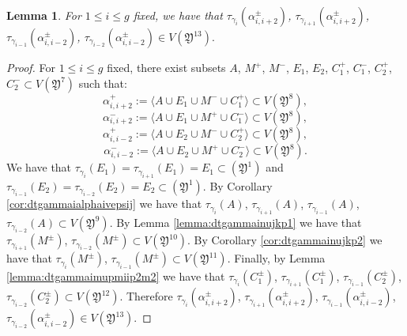 \documentclass{artv3}
\newtheorem{lemma}[theorem]{Lemma}
\newcommand*{\dt}[1]{\tau_{#1}}
\newcommand*{\Y}{\mathfrak{Y}}
\begin{document}
\begin{lemma}\label{lemma:dtgammaialphapmiip2m2}
For $1\leq i \leq g$ fixed, we have that $\dt{\gamma_i}(\alpha_{i,i+2}^{\pm})$, $\dt{\gamma_{i+1}}(\alpha_{i,i+2}^{\pm})$, $\dt{\gamma_{i-1}}(\alpha_{i,i-2}^{\pm})$, $\dt{\gamma_{i-2}}(\alpha_{i,i-2}^{\pm}) \in V(\Y^{13}).$
\end{lemma}
\begin{proof}
For $1 \leq i \leq g$ fixed, there exist subsets $A$, $M^+$, $M^-$, $E_1$, $E_2$, $C_1^+$, $C_1^-$, $C_2^+$, $C_2^-\subset V(\Y^7)$ such that: 
$$\alpha_{i,i+2}^{+} := \langle A \cup E_{1} \cup M^{-} \cup C_{1}^{+}\rangle \subset V(\Y^{8}),$$
$$\alpha_{i,i+2}^{-} := \langle A \cup E_{1} \cup M^{+} \cup C_{1}^{-}\rangle \subset V(\Y^{8}),$$
$$\alpha_{i,i-2}^{+} := \langle A \cup E_{2} \cup M^{-} \cup C_{2}^{+}\rangle \subset V(\Y^{8}),$$
$$\alpha_{i,i-2}^{-} := \langle A \cup E_{2} \cup M^{+} \cup C_{2}^{-}\rangle \subset V(\Y^{8}).$$
We have that $\dt{\gamma_i}(E_1) = \dt{\gamma_{i+1}}(E_1) = E_1\subset(\Y^1)$ and $\dt{\gamma_{i-1}}(E_2) = \dt{\gamma_{i-2}}(E_2) = E_2\subset(\Y^1)$. By Corollary \ref{cor:dtgammaialphaivepsij} we have that $\dt{\gamma_{i}}(A)$, $\dt{\gamma_{i+1}}(A)$, $\dt{\gamma_{i-1}}(A)$, $\dt{\gamma_{i-2}}(A)\subset V(\Y^9)$. By Lemma \ref{lemma:dtgammainujkp1} we have that $\dt{\gamma_{i+1}}(M^{\pm})$, $\dt{\gamma_{i-2}}(M^{\pm}) \subset V(\Y^{10})$. By Corollary \ref{cor:dtgammainujkp2} we have that $\dt{\gamma_{i}}(M^{\pm})$, $\dt{\gamma_{i-1}}(M^{\pm})\subset V(\Y^{11})$. Finally, by Lemma \ref{lemma:dtgammaimupmiip2m2} we have that $\dt{\gamma_{i}}(C_{1}^{\pm})$, $\dt{\gamma_{i+1}}(C_{1}^{\pm})$, $\dt{\gamma_{i-1}}(C_{2}^{\pm})$, $\dt{\gamma_{i-2}}(C_{2}^{\pm})\subset V(\Y^{12})$. Therefore $\dt{\gamma_i}(\alpha_{i,i+2}^{\pm})$, $\dt{\gamma_{i+1}}(\alpha_{i,i+2}^{\pm})$, $\dt{\gamma_{i-1}}(\alpha_{i,i-2}^{\pm})$, $\dt{\gamma_{i-2}}(\alpha_{i,i-2}^{\pm}) \in V(\Y^{13}).$
\end{proof}
\end{document}
